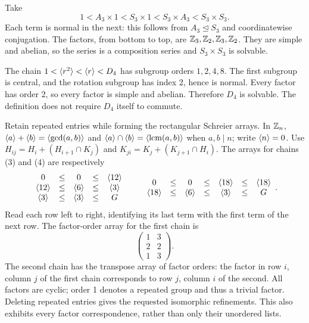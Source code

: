 Take
\[
1<A_3\times1<S_3\times1<S_3\times A_3<S_3\times S_3.
\]
Each term is normal in the next: this follows from $A_3\trianglelefteq S_3$ and coordinatewise conjugation. The factors, from bottom to top, are $\mathbb{Z}_3,\mathbb{Z}_2,\mathbb{Z}_3,\mathbb{Z}_2$. They are simple and abelian, so the series is a composition series and $S_3\times S_3$ is solvable.

The chain $1<\langle r^2\rangle<\langle r\rangle<D_4$ has subgroup orders $1,2,4,8$.
The first subgroup is central, and the rotation subgroup has index 2, hence is normal. Every factor has order 2, so every factor is simple and abelian. Therefore $D_4$ is solvable. The definition does not require $D_4$ itself to commute.

\idea Retain repeated entries while forming the rectangular Schreier arrays. In $\mathbb{Z}_n$, $\langle a\rangle+\langle b\rangle=\langle \gcd(a,b)\rangle$ and $\langle a\rangle\cap\langle b\rangle=\langle \operatorname{lcm}(a,b)\rangle$ when $a,b\mid n$; write $\langle n\rangle=0$.
Use $H_{ij}=H_i+(H_{i+1}\cap K_j)$ and $K_{ji}=K_j+(K_{j+1}\cap H_i)$. The arrays for chains (3) and (4) are respectively
\[
\begin{array}{ccccc}
0 &\le& 0 &\le& \langle 12\rangle\\
\langle 12\rangle &\le& \langle 6\rangle &\le& \langle 3\rangle\\
\langle 3\rangle &\le& \langle 3\rangle &\le& G\end{array}\qquad\begin{array}{ccccccc}
0 &\le& 0 &\le& \langle 18\rangle &\le& \langle 18\rangle\\
\langle 18\rangle &\le& \langle 6\rangle &\le& \langle 3\rangle &\le& G\end{array}.\]
Read each row left to right, identifying its last term with the first term of the next row. The factor-order array for the first chain is
\[
\begin{pmatrix}1&3\\2&2\\1&3\end{pmatrix}.
\]
The second chain has the transpose array of factor orders: the factor in row $i$, column $j$ of the first chain corresponds to row $j$, column $i$ of the second. All factors are cyclic; order 1 denotes a repeated group and thus a trivial factor. Deleting repeated entries gives the requested isomorphic refinements. This also exhibits every factor correspondence, rather than only their unordered lists.


